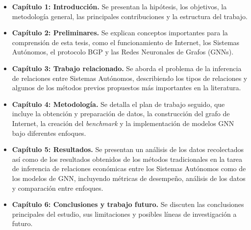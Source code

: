 \begin{itemize}
    \item \textbf{Capítulo 1: Introducción.} Se presentan la hipótesis, los objetivos, la metodología general, las principales contribuciones y la estructura del trabajo.
    
    \item \textbf{Capítulo 2: Preliminares.} Se explican conceptos importantes para la comprensión de esta tesis, como el funcionamiento de Internet, los Sistemas Autónomos, el protocolo BGP y las Redes Neuronales de Grafos (GNNs).
    
    \item \textbf{Capítulo 3: Trabajo relacionado.} Se aborda el problema de la inferencia de relaciones entre Sistemas Autónomos, describiendo los tipos de relaciones y algunos de los métodos previos propuestos más importantes en la literatura.
    
    \item \textbf{Capítulo 4: Metodología.} Se detalla el plan de trabajo seguido, que incluye la obtención y preparación de datos, la construcción del grafo de Internet, la creación del \textit{benchmark} y la implementación de modelos GNN bajo diferentes enfoques.
    
    \item \textbf{Capítulo 5: Resultados.} Se presentan un análisis de los datos recolectados así como de los resultados obtenidos de los métodos tradicionales en la tarea de inferencia de relaciones económicas entre los Sistemas Autónomos como de los modelos de GNN, incluyendo métricas de desempeño, análisis de los datos y comparación entre enfoques. 
    
    \item \textbf{Capítulo 6: Conclusiones y trabajo futuro.} Se discuten las conclusiones principales del estudio, sus limitaciones y posibles líneas de investigación a futuro.
    
\end{itemize}


